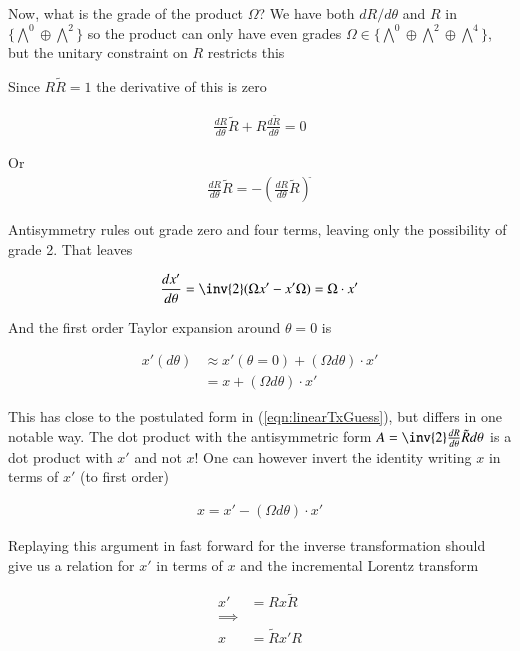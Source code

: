 Now, what is the grade of the product $\Omega$?  We have both $dR/d\theta$ and $R$ in 
$\{\bigwedge^0 \oplus \bigwedge^2\}$
so the product can only have even grades $\Omega \in \{\bigwedge^0 \oplus \bigwedge^2 \oplus \bigwedge^4\}$, but the 
unitary constraint on $R$ restricts this

Since $R \tilde{R} = 1$ the derivative of this is zero

\begin{align*}
\frac{dR}{d\theta} \tilde{R} + {R} \frac{d\tilde{R}}{d\theta}  = 0
\end{align*}

Or
\begin{align*}
\frac{dR}{d\theta} \tilde{R} = - \left( \frac{dR}{d\theta} \tilde{R} \right)^{\tilde{}}
\end{align*}

Antisymmetry rules out grade zero and four terms, leaving only the possibility of grade 2.  That leaves

\begin{align*}
\frac{dx'}{d\theta} = \inv{2}(\Omega x' - x' \Omega) = \Omega \cdot x'
\end{align*}

And the first order Taylor expansion around $\theta =0$ is

\begin{align*}
x'(d\theta) 
&\approx x'(\theta = 0) + ( \Omega d\theta ) \cdot x' \\
&= x + ( \Omega d\theta ) \cdot x'
\end{align*}

This has close to the postulated form in (\ref{eqn:linearTxGuess}), but differs in one notable way.  The dot product with the antisymmetric form $A = \inv{2} \frac{dR}{d\theta} \tilde{R} d\theta$ is a dot product with $x'$ and not $x$!  One can however 
invert the identity writing $x$ in terms of $x'$ (to first order)

\begin{align*}
x = x' - ( \Omega d\theta ) \cdot x'
\end{align*}

Replaying this argument in fast forward for the inverse transformation should give us a relation for $x'$ in terms of $x$
and the incremental Lorentz transform

\begin{align*}
x' &= R x \tilde{R} \\
\implies \\
x &= \tilde{R} x' {R} \\
\end{align*}

